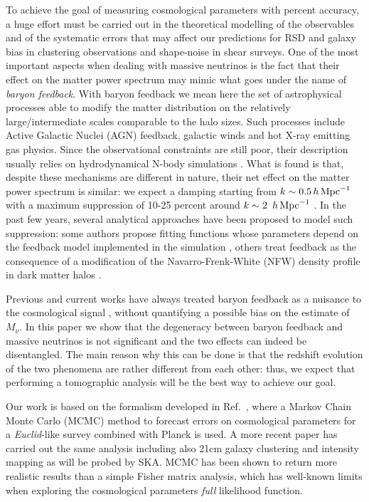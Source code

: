 \documentclass[a4paper,11pt]{article}
\def\kMpc{\, h \, {\rm Mpc}^{-1}}
\begin{document}
To achieve the goal of measuring cosmological parameters with percent accuracy, a huge effort must be carried out in the theoretical modelling of the observables and of the systematic errors that may affect our predictions for RSD and galaxy bias in clustering observations and shape-noise in shear surveys.
One of the most important aspects when dealing with massive neutrinos is the fact that their effect on the matter power spectrum may mimic what goes under the name of \textit{baryon feedback}.
With baryon feedback we mean here the set of astrophysical processes able to modify the matter distribution on the relatively large/intermediate scales comparable to the halo sizes.
Such processes include Active Galactic Nuclei (AGN) feedback, galactic winds and hot X-ray emitting gas physics.
Since the observational constraints are still poor, their description usually relies on hydrodynamical N-body simulations \cite{OWLs+10, Van_Daalen-feedback+11, Semboloni+11, Mummery-fb_vs_nu+17}.
What is found is that, despite these mechanisms are different in nature, their net effect on the matter power spectrum is similar: we expect a damping starting from $k\sim 0.5\kMpc$ with a maximum suppression of 10-25 percent around $k \sim 2 \ \kMpc$ \cite{Schneider+15}.
In the past few years, several analytical approaches have been proposed to model such suppression: some authors propose fitting functions whose parameters depend on the feedback model implemented in the simulation \cite{HD_feedback+15, Chisari-feedback+18}, others treat feedback as the consequence of a modification of the Navarro-Frenk-White (NFW) density profile in dark matter halos \cite{Mead-b+15, Schneider+15}.

Previous and current works have always treated baryon feedback as a nuisance to the cosmological signal \cite{DES_1yr+18, Koh-KiDS+17},
without quantifying a possible bias on the estimate of $M_\nu$.
In this paper we show that the degeneracy between baryon feedback and massive neutrinos is not significant and the two effects can indeed be disentangled.
The main reason why this can be done is that the redshift evolution of the two phenomena are rather different from each other: thus, we expect that  performing a tomographic analysis will be the best way to achieve our goal.

Our work is based on the formalism developed in Ref.~\cite{Audren+12}, where a Markov Chain Monte Carlo (MCMC) method to forecast errors on cosmological parameters for a \textit{Euclid}-like survey combined with Planck is used.
A more recent paper \cite{Sprenger+18} has carried out the same analysis including also 21cm galaxy clustering and intensity mapping as will be probed by SKA.
MCMC has been shown to return more realistic results than a simple Fisher matrix analysis, which has well-known limits when exploring the cosmological parameters {\em full} likelihood function.
\end{document}

